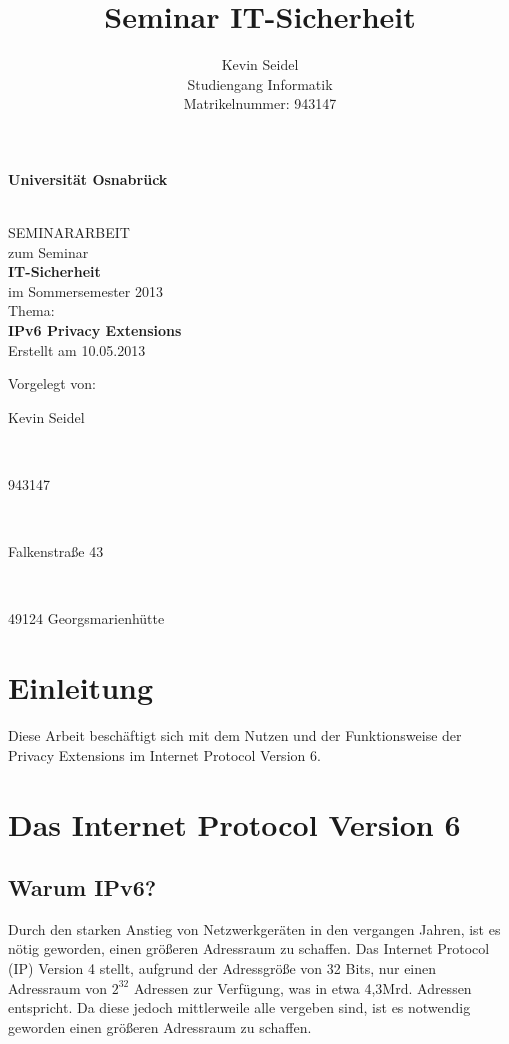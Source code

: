 \documentclass[a4paper, 12pt]{scrartcl}
\title{Seminar IT-Sicherheit}
\author{Kevin Seidel \\ Studiengang Informatik \\ Matrikelnummer: 943147}
\begin{document}
\begin{titlepage}
\begin{center}
\vspace*{1.5cm}
\begin{Large}
\textbf{Universität Osnabrück}
\end{Large}

\noindent\hrulefill
\\[3.5cm]
SEMINARARBEIT \\[1cm]
zum Seminar \\[1cm]
\textbf{IT-Sicherheit} \\[1.5cm]
im Sommersemester 2013 \\[1.5cm]
Thema: \\[0.5cm]
\textbf{IPv6 Privacy Extensions} \\[2cm]
Erstellt am 10.05.2013
\end{center}
\vfill
\begin{flushleft}
Vorgelegt von: 
\hfill \parbox{46mm}{Kevin Seidel} \\
\hfill \parbox{46mm}{943147} \\
\hfill \parbox{46mm}{Falkenstraße 43} \\
\hfill \parbox{46mm}{49124 Georgsmarienhütte}
\end{flushleft}
\end{titlepage}

\newpage

\setcounter{page}{2}
\tableofcontents

\newpage
{}
\setcounter{page}{1}

\section{Einleitung}
Diese Arbeit beschäftigt sich mit dem Nutzen und der Funktionsweise der Privacy Extensions im Internet Protocol Version 6.

\newpage

\section{Das Internet Protocol Version 6}
\subsection{Warum IPv6?}
Durch den starken Anstieg von Netzwerkgeräten in den vergangen Jahren, ist es nötig geworden, einen größeren Adressraum zu schaffen.
Das Internet Protocol (IP) Version 4 stellt, aufgrund der Adressgröße von 32 Bits, nur einen Adressraum von $2^{32}$ Adressen zur Verfügung, was in etwa 4,3Mrd. Adressen entspricht. Da diese jedoch mittlerweile alle vergeben sind, ist es notwendig geworden einen größeren Adressraum zu schaffen.
\end{document}
